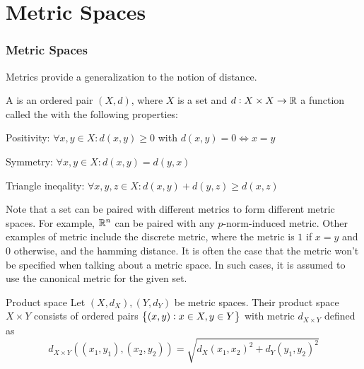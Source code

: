 \documentclass{styles/tufte}
\author{Jiaming (George) Yu}
\date{\today}
\begin{document}
\maketitle
\tableofcontents
\newpage



\part{Metric Spaces}

\section{Metric Spaces}

Metrics provide a generalization to the notion of distance.

\begin{definition}{}{}
  A  is an ordered pair $(X, d)$, where $X$ is a set and $d: X \times X \to \mathbb{R}$ a function called the  with the following properties:
  \begin{romanenum}
    \item Positivity: $\forall x, y \in X: d(x, y) \geqslant 0$ with $d(x, y) = 0 \iff x = y$
    \item Symmetry: $\forall x, y \in X: d(x, y) = d(y, x)$
    \item Triangle ineqality: $\forall x, y, z \in X: d(x, y) + d(y, z) \geqslant d(x, z)$
  \end{romanenum}
\end{definition}

Note that a set can be paired with different metrics to form different metric spaces. For example, $\mathbb{R}^n$ can be paired with any $p$-norm-induced metric. Other examples of metric include the discrete metric, where the metric is $1$ if $x = y$ and $0$ otherwise, and the hamming distance. It is often the case that the metric won't be specified when talking about a metric space. In such cases, it is assumed to use the canonical metric for the given set.

\begin{definition}{Product space}{}
  Let $(X, d_X), (Y, d_Y)$ be metric spaces. Their product space $X \times Y$ consists of ordered pairs $\set{(x, y): x \in X, y \in Y}$ with metric $d_{X \times Y}$ defined as
  \[ d_{X \times Y}((x_1, y_1), (x_2, y_2)) = \sqrt{d_X(x_1, x_2)^2 + d_Y(y_1, y_2)^2} \]
\end{definition}

%
\end{document}
